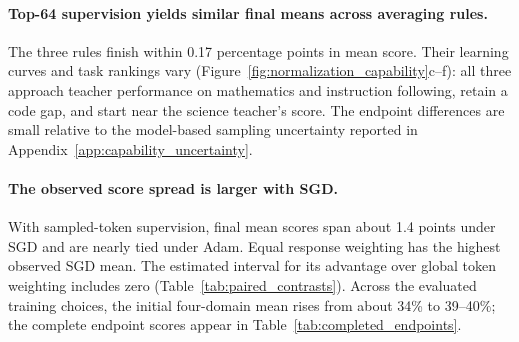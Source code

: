 \paragraph{Top-64 supervision yields similar final means across averaging rules.}
The three rules finish within 0.17 percentage points in mean score. Their learning curves and task rankings vary (Figure~\ref{fig:normalization_capability}c--f): all three approach teacher performance on mathematics and instruction following, retain a code gap, and start near the science teacher's score. The endpoint differences are small relative to the model-based sampling uncertainty reported in Appendix~\ref{app:capability_uncertainty}.


\paragraph{The observed score spread is larger with SGD.}
With sampled-token supervision, final mean scores span about 1.4 points under SGD and are nearly tied under Adam. Equal response weighting has the highest observed SGD mean. The estimated interval for its advantage over global token weighting includes zero (Table~\ref{tab:paired_contrasts}). Across the evaluated training choices, the initial four-domain mean rises from about 34\% to 39--40\%; the complete endpoint scores appear in Table~\ref{tab:completed_endpoints}.

\FloatBarrier
